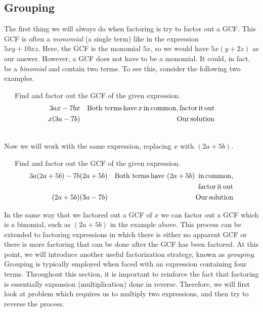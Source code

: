 \subsection{Grouping}\pp


{}\pp
The first thing we will always do when factoring is try to factor out a GCF.
This GCF is often a \textit{monomial} (a single term) like in the expression\\ $5 x y + 10 x z$.  Here, the GCF is
the monomial $5 x$, so we would have $5 x (y + 2 z)$ as our answer. However, a GCF does not
have to be a monomial.  It could, in fact, be a \textit{binomial} and contain two terms. To see this, consider the
following two examples.

\begin{example}~~~Find and factor out the GCF of the given expression.
  \begin{eqnarray*}
    3 a x - 7 b x &  & \operatorname{Both~terms} \operatorname{have} x \operatorname{in} \operatorname{common},
    \operatorname{factor} \operatorname{it} \operatorname{out}\\
    x (3 a - 7 b) &  & \operatorname{Our} \operatorname{solution}
  \end{eqnarray*}
\end{example}
~\\
Now we will work with the same expression, replacing $x$ with $(2 a + 5 b)$.\\

\begin{example}~~~Find and factor out the GCF of the given expression.
  \begin{eqnarray*}
    3 a (2 a + 5 b) - 7 b (2 a + 5 b) &  & \operatorname{Both~terms} \operatorname{have~} (2 a + 5 b)
    \operatorname{~in} \operatorname{common},\\
		&& ~~~\operatorname{factor} \operatorname{it} \operatorname{out}\\
    (2 a + 5 b) (3 a - 7 b) &  & \operatorname{Our} \operatorname{solution}
  \end{eqnarray*}
\end{example}

In the same way that we factored out a GCF of $x$ we can factor out a GCF which is
a binomial, such as $(2 a + 5 b)$ in the example above. This process can be extended to factoring expressions
in which there is either no apparent GCF or there is more factoring that can be done after the GCF has been factored.  At this point, we will introduce another useful factorization strategy, known as \textit{grouping}.  Grouping is typically employed when faced with an expression containing four terms.\pp
Throughout this section, it is important to reinforce the fact that factoring is essentially expansion (multiplication) done in reverse.  Therefore, we will first look at problem which requires us to multiply two expressions, and then try to reverse the process.


